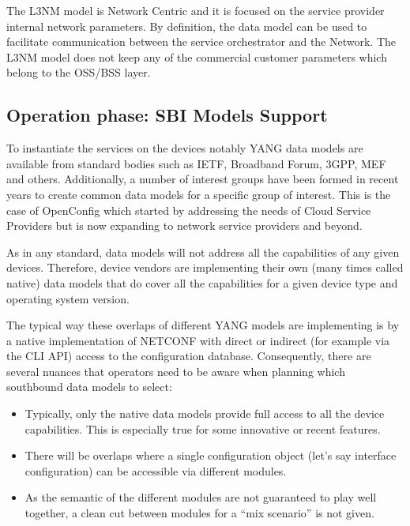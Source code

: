 \documentclass[conference]{IEEEtran}
\begin{document}
The L3NM model is Network Centric and it is focused on the service provider internal network parameters. By definition, the data model can be used to facilitate communication between the service orchestrator and the Network. The L3NM model does not keep any of the commercial customer parameters which belong to the OSS/BSS layer.

\subsection{Operation phase: SBI Models Support}

To instantiate the services on the devices notably YANG data models are available from standard bodies such as IETF, Broadband Forum, 3GPP, MEF and others. Additionally, a number of interest groups have been formed in recent years to create common data models for a specific group of interest. This is the case of OpenConfig which started by addressing the needs of Cloud Service Providers but is now expanding to network service providers and beyond. 

As in any standard, data models will not address all the capabilities of any given devices. Therefore, device vendors are implementing their own (many times called native) data models that do cover all the capabilities for a given device type and operating system version.

The typical way these overlaps of different YANG models are implementing is by a native implementation of NETCONF with direct or indirect (for example via the CLI API) access to the configuration database. Consequently, there are several nuances that operators need to be aware when planning which southbound data models to select:
\begin{itemize}
    \item Typically, only the native data models provide full access to all the device capabilities. This is especially true for some innovative or recent features.
    \item There will be overlaps where a single configuration object (let’s say interface configuration) can be accessible via different modules. 
    \item As the semantic of the different modules are not guaranteed to play well together, a clean cut between modules for a “mix scenario” is not given.
\end{itemize}
\end{document}
